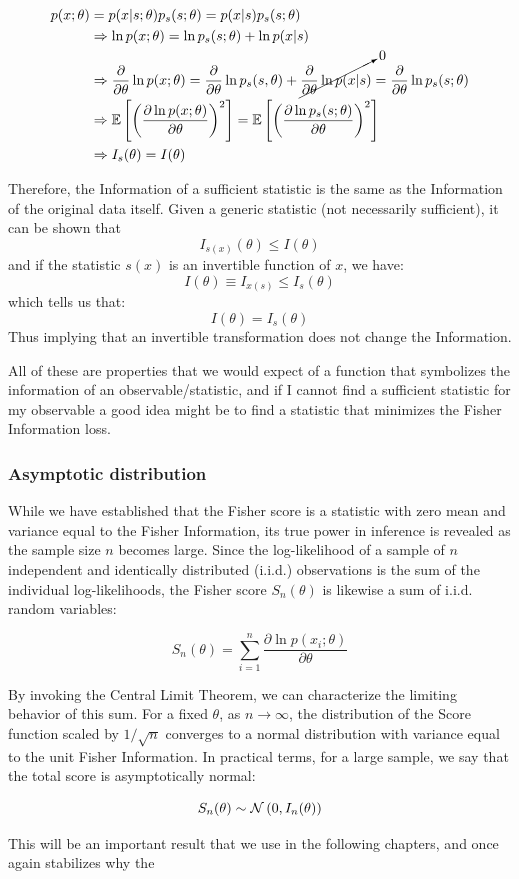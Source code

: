 \begin{align*}
	p(x;\theta)&=p(x|s;\theta)p_s(s;\theta)=p(x|s)p_s(s;\theta) \\ &\Rightarrow \ln p(x;\theta) = \ln p_s (s;\theta) + \ln p(x|s) \\
	&\Rightarrow \frac{\partial}{\partial \theta}\ln p(x;\theta) = \frac{\partial}{\partial\theta}\ln p_s(s,\theta) + \cancelto{0}{\frac{\partial}{\partial \theta}\ln p(x|s)} = \frac{\partial}{\partial\theta}\ln p_s(s;\theta)\\
	&\Rightarrow \mathbb{E}\left[\left(\frac{\partial\ln p(x;\theta)}{\partial\theta}\right)^2\right] = \mathbb{E}\left[\left(\frac{\partial\ln p_s(s;\theta)}{\partial\theta}\right)^2\right]\\
	&\Rightarrow I_s(\theta) = I(\theta)
\end{align*}

Therefore, the Information of a sufficient statistic is the same as the Information of the original data itself. Given a generic statistic (not necessarily sufficient), it can be shown that
	\[
	I_{s(x)}(\theta)\leq I(\theta)
	\]
and if the statistic $s(x)$ is an invertible function of $x$, we have:
	\[
	I(\theta)\equiv I_{x(s)}\leq I_s(\theta)
	\]
which tells us that:
	\[
	I(\theta) = I_s(\theta)
	\]
Thus implying that an invertible transformation does not change the Information.

All of these are properties that we would expect of a function that symbolizes the information of an observable/statistic, and if I cannot find a sufficient statistic for my observable a good idea might be to find a statistic that minimizes the Fisher Information loss.

\subsubsection{Asymptotic distribution}

While we have established that the Fisher score is a statistic with zero mean and variance equal to the Fisher Information, its true power in inference is revealed as the sample size $n$ becomes large. Since the log-likelihood of a sample of $n$ independent and identically distributed (i.i.d.) observations is the sum of the individual log-likelihoods, the Fisher score $S_n(\theta)$ is likewise a sum of i.i.d. random variables:

	\[
	S_n(\theta) = \sum_{i=1}^n \frac{\partial \ln p(x_i; \theta)}{\partial \theta}
	\]

By invoking the Central Limit Theorem, we can characterize the limiting behavior of this sum. For a fixed $\theta$, as $n \to \infty$, the distribution of the Score function scaled by $1/\sqrt{n}$ converges to a normal distribution with variance equal to the unit Fisher Information. In practical terms, for a large sample, we say that the total score is asymptotically normal:

\begin{equation}
	S_n(\theta) \sim \mathcal{N}\left(0, I_n(\theta)\right)
	\label{eq:Score_asymp}
\end{equation}

 This will be an important result that we use in the following chapters, and once again stabilizes why the 